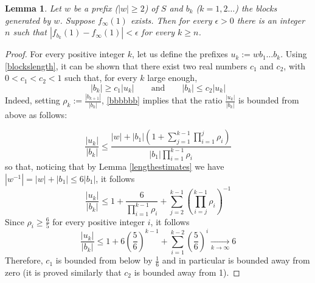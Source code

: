 \documentclass[10pt,a4paper]{article}
\newtheorem{lemma}{Lemma}
\begin{document}
\begin{lemma}
Let $w$ be a prefix ($|w|\ge 2$) of $S$ and $b_k$ ($k=1,2\dots$) the blocks generated by $w$. Suppose $f_{\infty}(1)$ exists. Then for every $\epsilon>0$ there is an integer $n$ such that $|f_{b_k}(1)-f_{\infty}(1)|<\epsilon$ for every $k\ge n$. 
\label{uniff}
\end{lemma}
\begin{proof}
For every positive integer $k$, let us define the prefixes $u_k:=wb_1\dots b_k$. Using \eqref{blockslength}, it can be shown that there exist two real numbers $c_1$ and $c_2$, with $0<c_1<c_2<1$ such that, for every $k$ large enough,
\begin{equation}|b_k| \ge c_1 |u_k|\qquad\text{and}\qquad
|b_k| \le c_2 |u_k|
\label{c_1c_2}
\end{equation}
Indeed, setting $\rho_k:= \frac{|b_{k+1}|}{|b_{k}|}$, \eqref{bbbbbb} implies that the ratio $\frac{|u_k|}{|b_k|}$ is bounded from above as follows: 

\begin{equation*}
\frac{|u_k|}{|b_k|}\le\frac{|w|+|b_1|\left(1+\sum_{j=1}^{k-1}\prod_{i=1}^{j}\rho_i\right)}{|b_1|\prod_{i=1}^{k-1}\rho_i}
\end{equation*}
so that, noticing that  by Lemma \ref{lengthestimates} we have $|w^{-1}|=|w|+|b_1|\le 6|b_1|$, it follows
\begin{equation*}
\frac{|u_k|}{|b_k|}\le 1+ \frac{6}{\prod_{i=1}^{k-1}\rho_i}+\sum_{j=2}^{k-1}\left(\prod_{i=j}^{k-1}\rho_i\right)^{-1}
\end{equation*}
Since $\rho_i\ge \frac{6}{5}$ for every positive integer $i$, it follows 
\begin{equation*}
\frac{|u_k|}{|b_k|}\le 1+6\left( \frac{5}{6} \right)^{k-1}+\sum_{i=1}^{k-2}\left(\frac{5}{6} \right)^{i} \xrightarrow[k \to \infty]{} 6
\end{equation*}
Therefore, $c_1$ is bounded from below by $\frac{1}{6}$ and in particular is bounded away from zero (it is proved similarly that $c_2$ is bounded away from 1).


\end{proof}
\end{document}
